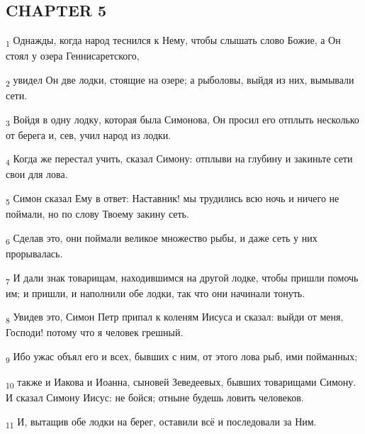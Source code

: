 \subsection{CHAPTER 5}
\begin{tcolorbox}
\textsubscript{1} Однажды, когда народ теснился к Нему, чтобы слышать слово Божие, а Он стоял у озера Геннисаретского,
\end{tcolorbox}
\begin{tcolorbox}
\textsubscript{2} увидел Он две лодки, стоящие на озере; а рыболовы, выйдя из них, вымывали сети.
\end{tcolorbox}
\begin{tcolorbox}
\textsubscript{3} Войдя в одну лодку, которая была Симонова, Он просил его отплыть несколько от берега и, сев, учил народ из лодки.
\end{tcolorbox}
\begin{tcolorbox}
\textsubscript{4} Когда же перестал учить, сказал Симону: отплыви на глубину и закиньте сети свои для лова.
\end{tcolorbox}
\begin{tcolorbox}
\textsubscript{5} Симон сказал Ему в ответ: Наставник! мы трудились всю ночь и ничего не поймали, но по слову Твоему закину сеть.
\end{tcolorbox}
\begin{tcolorbox}
\textsubscript{6} Сделав это, они поймали великое множество рыбы, и даже сеть у них прорывалась.
\end{tcolorbox}
\begin{tcolorbox}
\textsubscript{7} И дали знак товарищам, находившимся на другой лодке, чтобы пришли помочь им; и пришли, и наполнили обе лодки, так что они начинали тонуть.
\end{tcolorbox}
\begin{tcolorbox}
\textsubscript{8} Увидев это, Симон Петр припал к коленям Иисуса и сказал: выйди от меня, Господи! потому что я человек грешный.
\end{tcolorbox}
\begin{tcolorbox}
\textsubscript{9} Ибо ужас объял его и всех, бывших с ним, от этого лова рыб, ими пойманных;
\end{tcolorbox}
\begin{tcolorbox}
\textsubscript{10} также и Иакова и Иоанна, сыновей Зеведеевых, бывших товарищами Симону. И сказал Симону Иисус: не бойся; отныне будешь ловить человеков.
\end{tcolorbox}
\begin{tcolorbox}
\textsubscript{11} И, вытащив обе лодки на берег, оставили всё и последовали за Ним.
\end{tcolorbox}
